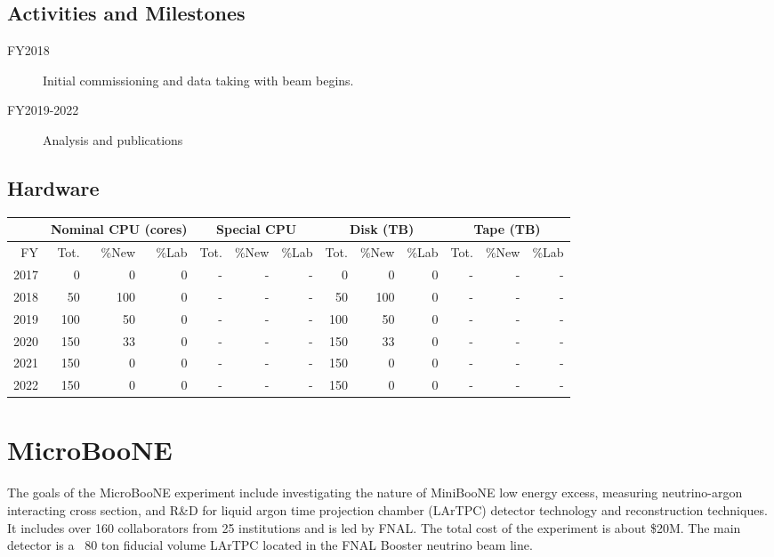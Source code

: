 \documentclass[pdftex,12pt,letter]{article}
\begin{document}
\subsection{Activities and Milestones}

\begin{description}
\item[FY2018] Initial commissioning and data taking with beam begins.
\item[FY2019-2022] Analysis and publications
\end{description}

\subsection{Hardware}

\begin{tabular}[h]{|r || r|r|r || r|r|r || r|r|r || r|r|r ||}
  \hline
   & \multicolumn{3}{c||}{Nominal CPU (cores)} & \multicolumn{3}{c||}{Special CPU} & \multicolumn{3}{c||}{Disk (TB)} & \multicolumn{3}{c||}{Tape (TB)} \\
   \hline
  FY & Tot. & \%New & \%Lab & Tot. & \%New & \%Lab & Tot. & \%New & \%Lab & Tot. & \%New & \%Lab \\
  \hline
  2017 &0 &0 &0 &   -& -& -& 0& 0& 0&- &- &- \\
  \hline
  2018 &50 & 100 &0& -& -& -&  50 & 100 & 0 &- &- &-  \\
  \hline
  2019 &100 & 50& 0& -& -& -& 100 & 50 & 0 &- &- &-  \\
  \hline
  2020 &150 & 33& 0& -& -& -& 150 & 33 & 0 &- &- &-  \\
  \hline
  2021 &150 & 0& 0& -& -& -& 150 & 0 & 0 &- &- &-  \\
  \hline
  2022 &150 & 0& 0& -& -& -& 150 & 0 & 0 &- &- &-  \\
  \hline
\end{tabular}



\pagebreak
\section{MicroBooNE}

The goals of the MicroBooNE experiment include investigating the nature of 
MiniBooNE low energy excess, measuring neutrino-argon interacting cross section,
and R\&D for liquid argon time projection chamber (LArTPC) detector technology 
and reconstruction techniques. It includes over 160 collaborators from 
25 institutions and is led by FNAL. The total cost of the experiment is about 
\$20M. The main detector is a ~80 ton fiducial volume LArTPC located in the 
FNAL Booster neutrino beam line. 
\end{document}
